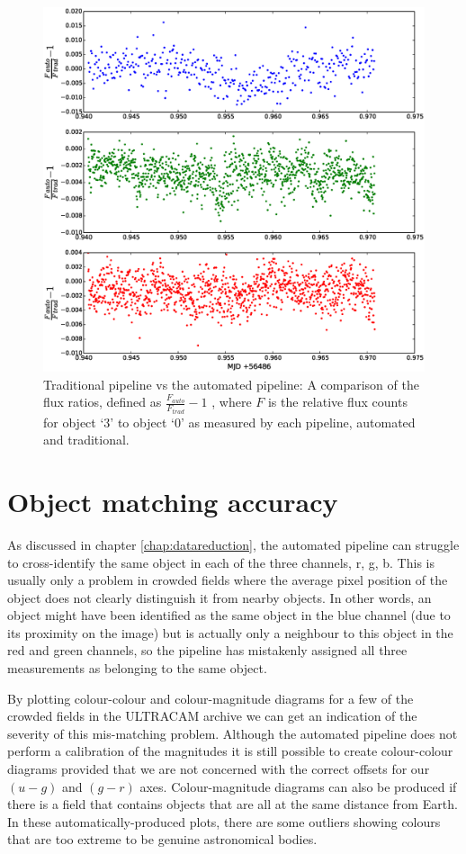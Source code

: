 \begin{figure}
\centering
\includegraphics[width=140mm]{images/ratio-of-ratios.eps}
\caption{Traditional pipeline vs the automated pipeline: A comparison of the flux ratios, defined as $\frac{F_{auto}}{F_{trad}} - 1$ , where $F$ is the relative flux counts for object `3' to object `0' as measured by each pipeline, automated and traditional.}
\label{fig:ratio-of-ratios}
\end{figure}


\section{Object matching accuracy}
As discussed in chapter \ref{chap:datareduction}, the automated pipeline can struggle to cross-identify the same object in each of the three channels, r, g, b. This is usually only a problem in crowded fields where the average pixel position of the object does not clearly distinguish it from nearby objects. In other words, an object might have been identified as the same object in the blue channel (due to its proximity on the image) but is actually only a neighbour to this object in the red and green channels, so the pipeline has mistakenly assigned all three measurements as belonging to the same object.

By plotting colour-colour and colour-magnitude diagrams for a few of the crowded fields in the ULTRACAM archive we can get an indication of the severity of this mis-matching problem. Although the automated pipeline does not perform a calibration of the magnitudes it is still possible to create colour-colour diagrams provided that we are not concerned with the correct offsets for our $(u-g)$ and $(g-r)$ axes. Colour-magnitude diagrams can also be produced if there is a field that contains objects that are all at the same distance from Earth. In these automatically-produced plots, there are some outliers showing colours that are too extreme to be genuine astronomical bodies. 

